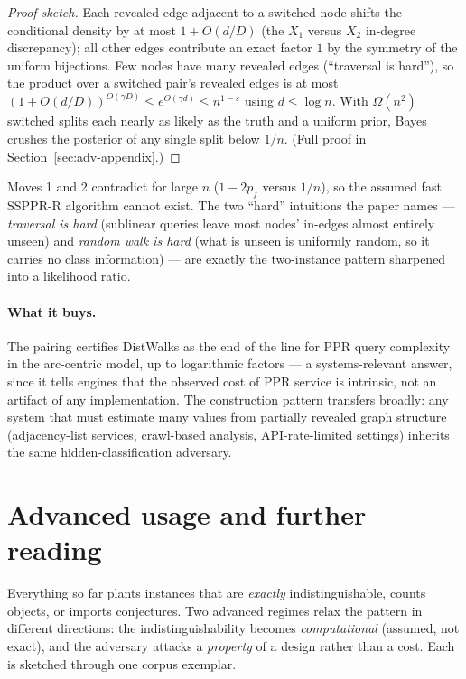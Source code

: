 \begin{proof}[Proof sketch]
Each revealed edge adjacent to a switched node shifts the conditional density by at most
$1 + O(d/D)$ (the $X_1$ versus $X_2$ in-degree discrepancy); all other edges contribute an
exact factor $1$ by the symmetry of the uniform bijections. Few nodes have many revealed edges
(``traversal is hard''), so the product over a switched pair's revealed edges is at most
$(1+O(d/D))^{O(\gamma D)} \le e^{O(\gamma d)} \le n^{1-\varepsilon}$ using $d \le \log n$.
With $\Omega(n^2)$ switched splits each nearly as likely as the truth and a uniform prior,
Bayes crushes the posterior of any single split below $1/n$. (Full proof in
Section~\ref{sec:adv-appendix}.)
\end{proof}

Moves 1 and 2 contradict for large $n$ ($1 - 2p_f$ versus $1/n$), so the assumed fast
SSPPR-R algorithm cannot exist. The two ``hard'' intuitions the paper names ---
\emph{traversal is hard} (sublinear queries leave most nodes' in-edges almost entirely unseen)
and \emph{random walk is hard} (what is unseen is uniformly random, so it carries no class
information) --- are exactly the two-instance pattern sharpened into a likelihood ratio.

\paragraph{What it buys.}
The pairing certifies DistWalks as the end of the line for PPR query complexity in the
arc-centric model, up to logarithmic factors --- a systems-relevant answer, since it tells
engines that the observed cost of PPR service is intrinsic, not an artifact of any
implementation. The construction pattern transfers broadly: any system that must estimate
many values from partially revealed graph structure (adjacency-list services, crawl-based
analysis, API-rate-limited settings) inherits the same hidden-classification adversary.

\section{Advanced usage and further reading}
\label{sec:adv-advanced}

Everything so far plants instances that are \emph{exactly} indistinguishable, counts objects,
or imports conjectures. Two advanced regimes relax the pattern in different directions: the
indistinguishability becomes \emph{computational} (assumed, not exact), and the adversary
attacks a \emph{property} of a design rather than a cost. Each is sketched through one corpus
exemplar.

